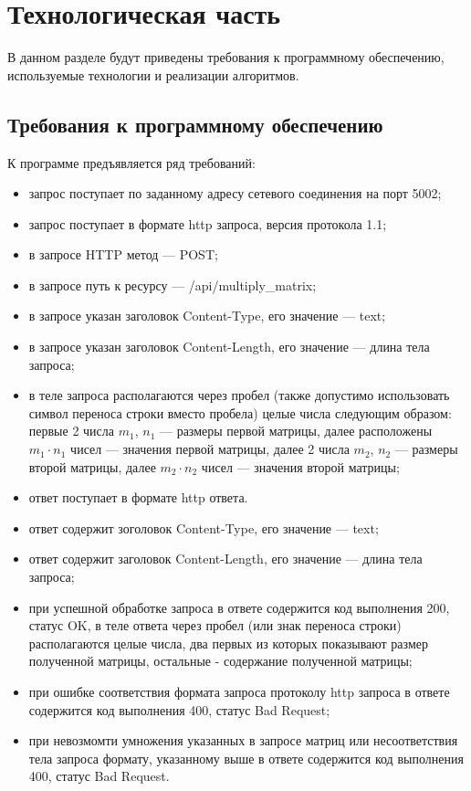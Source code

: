 \chapter{Технологическая часть}

В данном разделе будут приведены требования к программному обеспечению, используемые технологии и реализации алгоритмов.

\section{Требования к программному обеспечению}

К программе предъявляется ряд требований:

\begin{itemize}
	\item запрос поступает по заданному адресу сетевого соединения на порт 5002;
	\item запрос поступает в формате http запроса, версия протокола 1.1;
	\item в запросе HTTP метод — POST;
	\item в запросе путь к ресурсу — /api/multiply\_matrix;
	\item в запросе указан заголовок Content-Type, его значение — text;
	\item в запросе указан заголовок Content-Length, его значение — длина тела запроса;
	\item в теле запроса располагаются через пробел (также допустимо использовать символ переноса строки вместо пробела) целые числа следующим образом: первые 2 числа $m_1$,  $n_1$ — размеры первой матрицы, далее расположены $m_1 \cdot n_1$ чисел — значения первой матрицы, далее 2 числа $m_2$, $n_2$ — размеры второй матрицы, далее $m_2 \cdot n_2$ чисел — значения второй матрицы;
	\item ответ поступает в формате http ответа.
	\item ответ содержит зоголовок Content-Type, его значение — text;
	\item ответ содержит заголовок Content-Length, его значение — длина тела запроса;
	\item при успешной обработке запроса в ответе содержится код выполнения 200, статус OK, в теле ответа через пробел (или знак переноса строки) располагаются целые числа, два первых из которых показывают размер полученной матрицы, остальные - содержание полученной матрицы;
	\item при ошибке соответствия формата запроса протоколу http запроса в ответе содержится код выполнения 400, статус Bad Request;
	\item при невозмомти умножения указанных в запросе матриц или несоответствия тела запроса формату, указанному выше в ответе содержится код выполнения 400, статус Bad Request.
\end{itemize}

